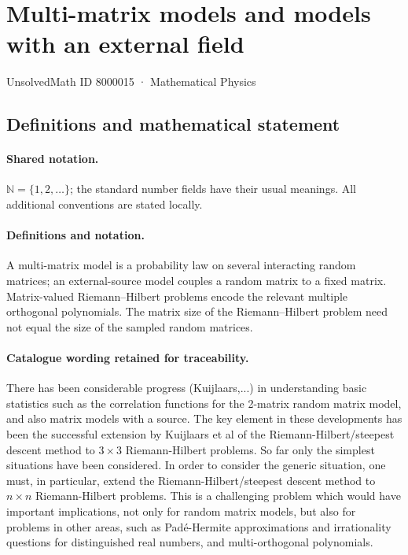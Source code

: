 \documentclass[11pt]{article}
\begin{document}
\setcounter{section}{8000014}
\section{Multi-matrix models and models with an external field}\label{8000015}
{\small UnsolvedMath ID 8000015 · Mathematical Physics}
\subsection{Definitions and mathematical statement}

\paragraph{Shared notation.}$\mathbb N=\{1,2,\ldots\}$; the standard number fields have their usual meanings. All additional conventions are stated locally.


\paragraph{Definitions and notation.}A multi-matrix model is a probability law on several interacting random matrices; an external-source model couples a random matrix to a fixed matrix. Matrix-valued Riemann--Hilbert problems encode the relevant multiple orthogonal polynomials. The matrix size of the Riemann--Hilbert problem need not equal the size of the sampled random matrices.

\paragraph{Catalogue wording retained for traceability.}
There has been considerable progress (Kuijlaars,...) in understanding basic statistics such as the correlation functions for the 2-matrix random matrix model, and also matrix models with a source. The key element in these developments has been the successful extension by Kuijlaars et al of the Riemann-Hilbert/steepest descent method to $3\times3$ Riemann-Hilbert problems. So far only the simplest situations have been considered. In order to consider the generic situation, one must, in particular, extend the Riemann-Hilbert/steepest descent method to $n\times n$ Riemann-Hilbert problems. This is a challenging problem which would have important implications, not only for random matrix models, but also for problems in other areas, such as Pad\'e-Hermite approximations and irrationality questions for distinguished real numbers, and multi-orthogonal polynomials.
\end{document}
